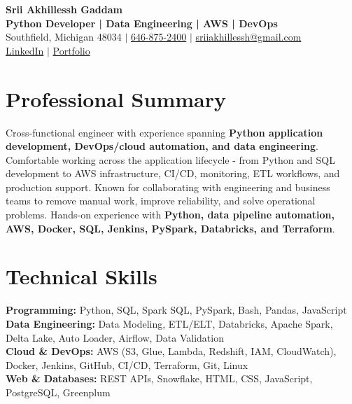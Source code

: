 \documentclass[letterpaper,10pt]{article}
\begin{document}
\fontsize{9.35pt}{10.45pt}\selectfont

\begin{center}
    {\LARGE \textbf{Srii Akhillessh Gaddam}} \\[-1pt]
    \textbf{Python Developer | Data Engineering | AWS | DevOps} \\[2pt]
    Southfield, Michigan 48034 $|$
    \href{tel:6468752400}{646-875-2400} $|$
    \href{mailto:sriiakhillessh@gmail.com}{sriiakhillessh@gmail.com} \\[1pt]
    \href{https://www.linkedin.com/in/srii-akhiilessh-gaddam-b48668191/}{LinkedIn} $|$
    \href{https://sriiakhillesshg.github.io/portfolio/}{Portfolio}
\end{center}
\vspace{-8pt}

\section{Professional Summary}
\small{Cross-functional engineer with experience spanning \textbf{Python application development, DevOps/cloud automation, and data engineering}. Comfortable working across the application lifecycle - from Python and SQL development to AWS infrastructure, CI/CD, monitoring, ETL workflows, and production support. Known for collaborating with engineering and business teams to remove manual work, improve reliability, and solve operational problems. Hands-on experience with \textbf{Python, data pipeline automation, AWS, Docker, SQL, Jenkins, PySpark, Databricks, and Terraform}.}

\section{Technical Skills}
\small{
\textbf{Programming:} Python, SQL, Spark SQL, PySpark, Bash, Pandas, JavaScript \\
\textbf{Data Engineering:} Data Modeling, ETL/ELT, Databricks, Apache Spark, Delta Lake, Auto Loader, Airflow, Data Validation \\
\textbf{Cloud \& DevOps:} AWS (S3, Glue, Lambda, Redshift, IAM, CloudWatch), Docker, Jenkins, GitHub, CI/CD, Terraform, Git, Linux \\
\textbf{Web \& Databases:} REST APIs, Snowflake, HTML, CSS, JavaScript, PostgreSQL, Greenplum
}
\end{document}
